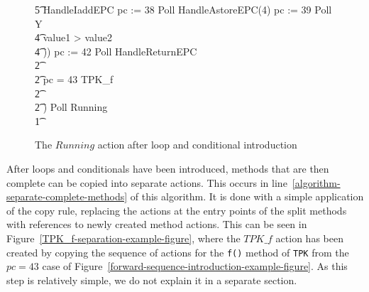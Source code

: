 \begin{figure}[tp!]
{\begin{circus}
    \t5 HandleIaddEPC \circseq pc := 38 \circseq Poll \circseq HandleAstoreEPC(4) \circseq pc := 39 \circseq Poll \circseq Y \\
    \t4 {} \circelse value1 > value2 \circthen \Skip \\
    \t4 \circfi)) \circseq pc := 42 \circseq Poll \circseq HandleReturnEPC \\
    \t2 {} \cdots {} \\
    \t2 {} \circelse pc = 43 \circthen TPK\_f \\
    \t2 {} \cdots {} \\
    \t2 \circfi) \circseq Poll \circseq Running \\
    \t1 \circfi
  \end{circus}
  }
  \caption{The $Running$ action after loop and conditional introduction}
  \label{loop-and-conditional-introduction-example-figure}
\end{figure}

After loops and conditionals have been introduced, methods that are
then complete can be copied into separate actions.
This occurs in line~\ref{algorithm-separate-complete-methods} of this
algorithm.
It is done with a simple application of the copy rule, replacing the
actions at the entry points of the split methods with references to
newly created method actions.
This can be seen in Figure~\ref{TPK_f-separation-example-figure},
where the $TPK\_f$ action has been created by copying the sequence of
actions for the \texttt{f()} method of \texttt{TPK} from the $pc = 43$
case of Figure~\ref{forward-sequence-introduction-example-figure}.
As this step is relatively simple, we do not explain it in a separate
section.
\begin{figure}[tp!]
  \setlength{\zedindent}{0cm}
  \setlength{\zedtab}{0.3cm}
  \setlength{\zedleftsep}{0cm}
  \setlength{\abovedisplayskip}{0cm}
  \setlength{\belowdisplayskip}{0cm}
\end{figure}

